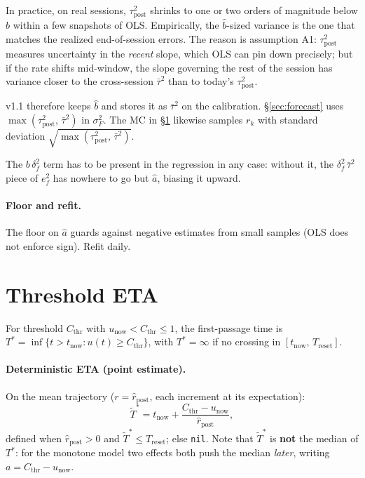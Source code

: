 \documentclass[11pt]{article}
\newcommand{\rpost}{\hat r_{\text{post}}}
\newcommand{\taupostsq}{\tau_{\text{post}}^2}
\newcommand{\unow}{u_{\text{now}}}
\newcommand{\tnow}{t_{\text{now}}}
\newcommand{\Treset}{T_{\text{reset}}}
\newcommand{\Cthr}{C_{\text{thr}}}
\newcommand{\Tstar}{T^\ast}
\begin{document}
In practice, on real sessions, $\taupostsq$ shrinks to one or two orders of
magnitude below $\hat b$ within a few snapshots of OLS. Empirically, the
$\hat b$-sized variance is the one that matches the realized end-of-session
errors. The reason is assumption A1: $\taupostsq$ measures uncertainty in
the \emph{recent} slope, which OLS can pin down precisely; but if the rate
shifts mid-window, the slope governing the rest of the session has variance
closer to the cross-session $\bar\tau^2$ than to today's $\taupostsq$.

v1.1 therefore keeps $\hat b$ and stores it as $\bar\tau^2$ on the
calibration. \S\ref{sec:forecast} uses $\max(\taupostsq,\, \bar\tau^2)$ in
$\sigma_F^2$. The MC in \S\ref{sec:eta} likewise samples $r_k$ with standard deviation
$\sqrt{\max(\taupostsq,\, \bar\tau^2)}$.

The $b\,\delta_f^2$ term has to be present in the regression in any case:
without it, the $\delta_f^2\,\bar\tau^2$ piece of $e_f^2$ has nowhere to go
but $\hat a$, biasing it upward.

\paragraph{Floor and refit.} The floor on $\hat a$ guards against negative
estimates from small samples (OLS does not enforce sign). Refit daily.

\section{Threshold ETA}\label{sec:eta}

For threshold $\Cthr$ with $\unow < \Cthr \leq 1$, the first-passage time is
$\Tstar = \inf\{t > \tnow : u(t) \geq \Cthr\}$, with $\Tstar = \infty$ if no
crossing in $[\tnow,\, \Treset]$.

\paragraph{Deterministic ETA (point estimate).} On the mean trajectory ($r =
\rpost$, each increment at its expectation):
\[
  \tilde\Tstar = \tnow + \frac{\Cthr - \unow}{\rpost},
\]
defined when $\rpost > 0$ and $\tilde\Tstar \leq \Treset$; else
\texttt{nil}. Note that $\tilde\Tstar$ is \textbf{not} the median of $\Tstar$:
for the monotone model two effects both push the median \emph{later}, writing
$a = \Cthr - \unow$.
\end{document}
